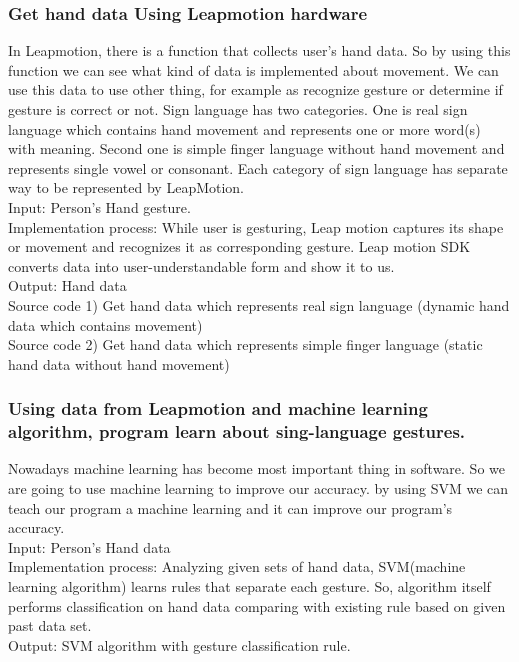 \documentclass[10pt,journal,compsoc]{IEEEtran}
\begin{document}
\subsubsection{Get hand data Using Leapmotion hardware\\}
In Leapmotion, there is a function that collects user’s hand data. So by using this function we can see what kind of data is implemented about movement. We can use this data to use other thing, for example as recognize gesture or determine if gesture is correct or not.
Sign language has two categories. One is real sign language which contains hand movement and represents one or more word(s) with meaning. Second one is simple finger language without hand movement and represents single vowel or consonant. Each category of sign language has separate way to be represented by LeapMotion.
\\Input: Person's Hand gesture.
\\Implementation process: While user is gesturing, Leap motion captures its shape or movement and recognizes it as corresponding gesture. Leap motion SDK converts data into user-understandable form and show it to us.
\\Output: Hand data
\\Source code 1) Get hand data which represents real sign language (dynamic hand data which contains movement)\\
Source code 2) Get hand data which represents simple finger language (static hand data without hand movement)\\



\subsubsection {Using data from Leapmotion and machine learning algorithm, program learn about sing-language gestures.\\}
Nowadays machine learning has become most important thing in software. So we are going to use machine learning to improve our accuracy. by using SVM we can teach our program a machine learning and it can improve our program’s accuracy.
\\Input: Person's Hand data
\\Implementation process: Analyzing given sets of hand data, SVM(machine learning algorithm) learns rules that separate each gesture. So, algorithm itself performs classification on hand data comparing with existing rule based on given past data set.
\\Output: SVM algorithm with gesture classification rule.
\end{document}
